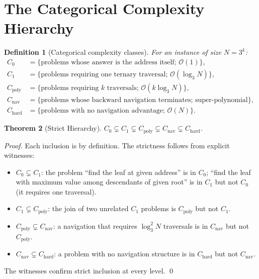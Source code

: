 \documentclass[twocolumn,a4paper]{article}
\newtheorem{theorem}{Theorem}[section]
\newtheorem{definition}[theorem]{Definition}
\begin{document}
\section{The Categorical Complexity Hierarchy}
\label{sec:cat-complexity}

\begin{definition}[Categorical complexity classes]
\label{def:cat-complexity}
For an instance of size $N=3^{k}$:
\begin{align*}
C_{0} &= \{\text{problems whose answer is the address itself; } \mathcal{O}(1)\},\\
C_{1} &= \{\text{problems requiring one ternary traversal; } \mathcal{O}(\log_{3}N)\},\\
C_{\text{poly}} &= \{\text{problems requiring }k\text{ traversals; } \mathcal{O}(k\log_{3}N)\},\\
C_{\text{nav}} &= \{\text{problems whose backward navigation terminates; super-polynomial}\},\\
C_{\text{hard}} &= \{\text{problems with no navigation advantage; } \mathcal{O}(N)\}.
\end{align*}
\end{definition}

\begin{theorem}[Strict Hierarchy]
\label{thm:strict-hierarchy}
$C_{0}\subsetneq C_{1}\subsetneq C_{\text{poly}}\subsetneq C_{\text{nav}}\subsetneq C_{\text{hard}}$.
\end{theorem}

\begin{proof}
Each inclusion is by definition. The strictness follows from explicit witnesses:
\begin{itemize}[nosep,leftmargin=*]
\item $C_{0}\subsetneq C_{1}$: the problem ``find the leaf at given address'' is in $C_{0}$; ``find the leaf with maximum value among descendants of given root'' is in $C_{1}$ but not $C_{0}$ (it requires one traversal).
\item $C_{1}\subsetneq C_{\text{poly}}$: the join of two unrelated $C_{1}$ problems is $C_{\text{poly}}$ but not $C_{1}$.
\item $C_{\text{poly}}\subsetneq C_{\text{nav}}$: a navigation that requires $\log_{3}^{2}N$ traversals is in $C_{\text{nav}}$ but not $C_{\text{poly}}$.
\item $C_{\text{nav}}\subsetneq C_{\text{hard}}$: a problem with no navigation structure is in $C_{\text{hard}}$ but not $C_{\text{nav}}$.
\end{itemize}
The witnesses confirm strict inclusion at every level. \qed
\end{proof}
\end{document}
